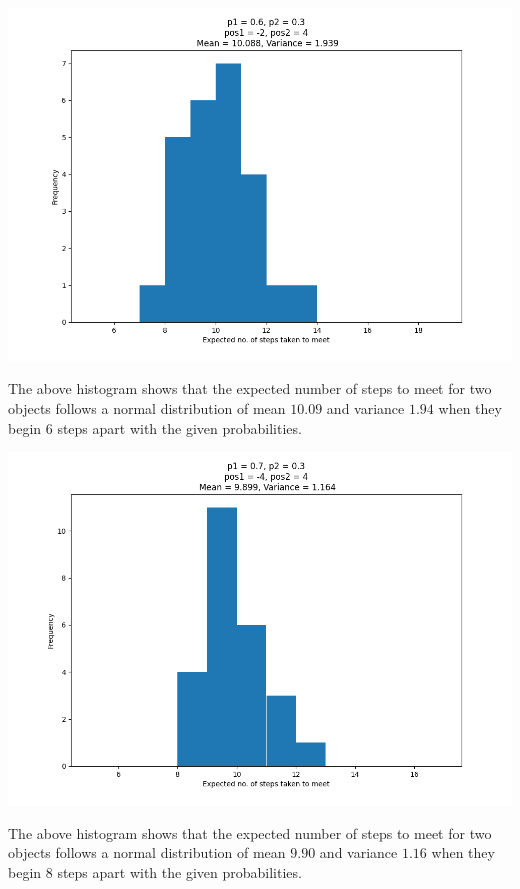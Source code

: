 \documentclass[answers]{exam}
\begin{document}
\begin{center}
  \includegraphics[scale = 0.5]{Q1/1.3/Q1.3 _p1 = 0.6_p2 = 0.3_pos1 = -2_pos2 = 4.png}
\end{center}

The above histogram shows that the expected number of steps to meet for two objects follows a normal distribution of mean $10.09$ and variance $1.94$ when they begin 6 steps apart with the given probabilities. \\
\begin{center}\includegraphics[scale = 0.5]{Q1/1.3/Q1.3 _p1 = 0.7_p2 = 0.3_pos1 = -4_pos2 = 4.png}\end{center}
The above histogram shows that the expected number of steps to meet for two objects follows a normal distribution of mean $9.90$ and variance $1.16$ when they begin 8 steps apart with the given probabilities. \\
\end{document}

